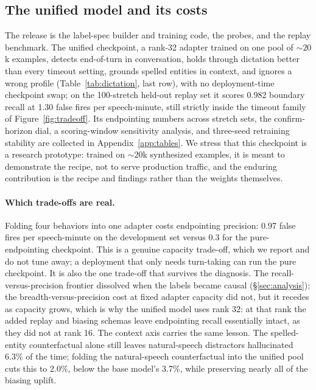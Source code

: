 \documentclass[11pt]{article}
\begin{document}
\subsection{The unified model and its costs}
\label{sec:released}

The release is the label-spec builder and training code, the probes, and the replay benchmark. The unified checkpoint, a rank-32 adapter trained on one pool of ${\sim}20$k examples, detects end-of-turn in conversation, holds through dictation better than every timeout setting, grounds spelled entities in context, and ignores a wrong profile (Table~\ref{tab:dictation}, last row), with no deployment-time checkpoint swap; on the 100-stretch held-out replay set it scores 0.982 boundary recall at 1.30 false fires per speech-minute, still strictly inside the timeout family of Figure~\ref{fig:tradeoff}. Its endpointing numbers across stretch sets, the confirm-horizon dial, a scoring-window sensitivity analysis, and three-seed retraining stability are collected in Appendix~\ref{app:tables}. We stress that this checkpoint is a research prototype: trained on ${\sim}20$k synthesized examples, it is meant to demonstrate the recipe, not to serve production traffic, and the enduring contribution is the recipe and findings rather than the weights themselves.

\paragraph{Which trade-offs are real.} Folding four behaviors into one adapter costs endpointing precision: 0.97 false fires per speech-minute on the development set versus 0.3 for the pure-endpointing checkpoint. This is a genuine capacity trade-off, which we report and do not tune away; a deployment that only needs turn-taking can run the pure checkpoint. It is also the one trade-off that survives the diagnosis. The recall-versus-precision frontier dissolved when the labels became causal (\S\ref{sec:analysis}); the breadth-versus-precision cost at fixed adapter capacity did not, but it recedes as capacity grows, which is why the unified model uses rank 32: at that rank the added replay and biasing schemas leave endpointing recall essentially intact, as they did not at rank 16. The context axis carries the same lesson. The spelled-entity counterfactual alone still leaves natural-speech distractors hallucinated 6.3\% of the time; folding the natural-speech counterfactual into the unified pool cuts this to 2.0\%, below the base model's 3.7\%, while preserving nearly all of the biasing uplift.
\end{document}
